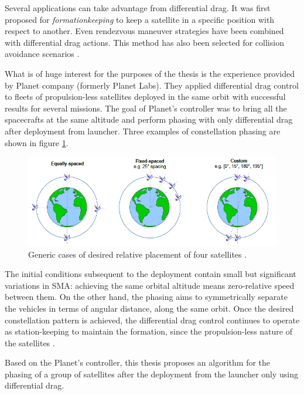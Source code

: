 Several applications can take advantage from differential drag. 
It was first proposed for \textit{formationkeeping} to keep a satellite in a specific position with respect to another.
Even rendezvous maneuver strategies have been combined with differential drag actions.
This method has also been selected for collision avoidance scenarios \cite{foster2018differential}.

What is of huge interest for the purposes of the thesis is the experience provided by Planet company (formerly Planet Labs).
They applied differential drag control to fleets of propulsion-less satellites deployed in the same orbit with successful results for several missions.
The goal of Planet's controller was to bring all the spacecrafts at the same altitude and perform phasing with only differential drag after deployment from launcher.
Three examples of constellation phasing are shown in figure \ref{phasing_examples_figure}.
\begin{figure}[h]
    \centering
    \includegraphics[scale=1]{img/phasing_examples.png}
    \caption{Generic cases of desired relative placement of four satellites \cite{foster2018differential}.}
    \label{phasing_examples_figure}
\end{figure}
The initial conditions subsequent to the deployment contain small but significant variations in SMA: achieving the same orbital altitude means zero-relative speed between them.
On the other hand, the phasing aims to symmetrically separate the vehicles in terms of angular distance, along the same orbit. 
Once the desired constellation pattern is achieved, the differential drag control continues to operate as station-keeping to maintain the formation, since the propulsion-less nature of the satellites \cite{foster2018differential}.

Based on the Planet's controller, this thesis proposes an algorithm for the phasing of a group of satellites after the deployment from the launcher only using differential drag. 


